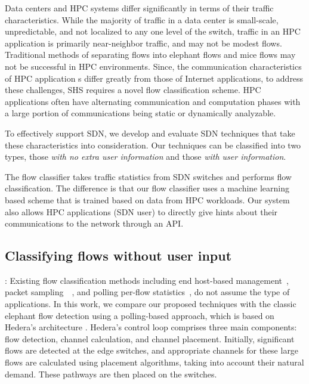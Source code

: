 Data centers and HPC systems differ significantly in terms of their traffic characteristics. While the majority of traffic in a data center is small-scale, unpredictable, and not localized to any one level of the switch, traffic in an HPC application is primarily near-neighbor traffic, and may not be modest flows. Traditional methods of separating flows into elephant flows and mice flows may not be successful in HPC environments.
Since, the communication characteristics of HPC application
s differ greatly from those of Internet applications, to address these challenges, SHS requires a novel flow classification scheme.
HPC applications often have alternating
communication and computation phases with a large portion of
communications being
static or dynamically analyzable.

To effectively support SDN, we develop and evaluate
SDN techniques
that take these characteristics into consideration. 
Our techniques can be classified into two types,
those {\em with no extra user information} and
those {\em with user information}.

The flow classifier takes traffic statistics from
SDN switches and performs flow classification. The difference is that our
flow classifier uses a machine learning based scheme that is trained based
on data from HPC workloads. Our system also allows HPC applications
(SDN user) to directly
give hints about their communications to the network through an API. 


\subsection{Classifying flows without user input}


\vspace{0.08in}
:
Existing flow classification methods including end host-based
management~\cite{xu2015identifying},
packet sampling~\cite{suh2014opensample}~\cite{afek2015sampling},
and polling per-flow statistics~\cite{yang2020flow}, do not assume
the type of applications. In this work, we compare our proposed techniques with
the classic elephant flow detection using a polling-based approach,
which is based on Hedera's architecture \cite{al2010hedera}.
Hedera's control loop comprises
three main components: flow detection, channel calculation, and channel
placement. Initially, significant 
flows are detected at the edge switches, and appropriate channels for these 
large flows are calculated using placement algorithms, taking into account 
their natural demand. These pathways are then placed on the switches.

